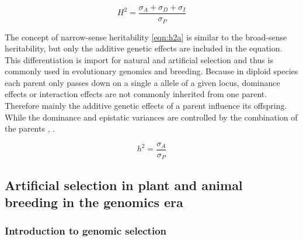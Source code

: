 \begin{equation}
 H^2 = \frac{\sigma_{A} + \sigma_{D} + \sigma_{I}}{\sigma_{P}}
 \label{eqn:h2G}
\end{equation}

The concept of narrow-sense heritability \ref{eqn:h2a} is similar to the broad-sense
heritability, but only the additive genetic effects are included in the equation. This
differentiation is import for natural and artificial selection and thus is commonly used
in evolutionary genomics and breeding. Because in diploid species each parent only passes
down on a single a allele of a given locus, dominance effects or interaction effects are
not commonly inherited from one parent. Therefore mainly the additive genetic effects of a
parent influence its offspring. While the dominance and epistatic variances are controlled
by the combination of the parents \cite{falconer1996}, \cite{walsh2018}.

\begin{equation}
  h^2 = \frac{\sigma_{A}}{\sigma_{P}}
 \label{eqn:h2a}
\end{equation}

\subsection{Artificial selection in plant and animal breeding in the genomics era}
\subsubsection{Introduction to genomic selection } \label{intro:gs}

